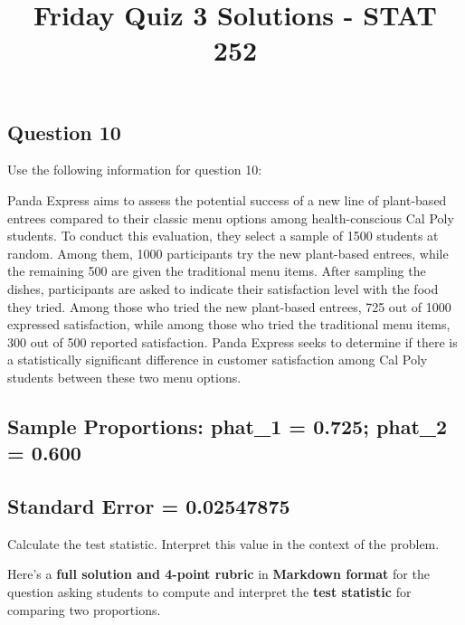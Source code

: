 \documentclass[
  letterpaper,
  DIV=11,
  numbers=noendperiod]{scrartcl}
\title{Friday Quiz 3 Solutions - STAT 252}
\author{}
\date{}
\begin{document}
\maketitle
\ifdefined\Shaded\renewenvironment{Shaded}{\begin{tcolorbox}[frame hidden, enhanced, borderline west={3pt}{0pt}{shadecolor}, interior hidden, boxrule=0pt, sharp corners, breakable]}{\end{tcolorbox}}\fi

\hypertarget{question-10}{%
\subsection{Question 10}\label{question-10}}

Use the following information for question 10:

Panda Express aims to assess the potential success of a new line of
plant-based entrees compared to their classic menu options among
health-conscious Cal Poly students. To conduct this evaluation, they
select a sample of 1500 students at random. Among them, 1000
participants try the new plant-based entrees, while the remaining 500
are given the traditional menu items. After sampling the dishes,
participants are asked to indicate their satisfaction level with the
food they tried. Among those who tried the new plant-based entrees, 725
out of 1000 expressed satisfaction, while among those who tried the
traditional menu items, 300 out of 500 reported satisfaction. Panda
Express seeks to determine if there is a statistically significant
difference in customer satisfaction among Cal Poly students between
these two menu options.

\hypertarget{sample-proportions-phat_1-0.725-phat_2-0.600}{%
\subsection{Sample Proportions: phat\_1 = 0.725; phat\_2 =
0.600}\label{sample-proportions-phat_1-0.725-phat_2-0.600}}

\hypertarget{standard-error-0.02547875}{%
\subsection{Standard Error =
0.02547875}\label{standard-error-0.02547875}}

Calculate the test statistic. Interpret this value in the context of the
problem.

Here's a \textbf{full solution and 4-point rubric} in \textbf{Markdown
format} for the question asking students to compute and interpret the
\textbf{test statistic} for comparing two proportions.
\end{document}
